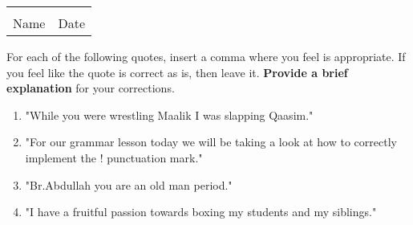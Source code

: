 \documentclass[12pt]{article} %
\begin{document}
  \vspace*{0.4cm}

	\begin{center}
	\noindent\begin{tabular}{ll}
		\makebox[3in]{\hrulefill} & \makebox[3in]{\hrulefill}\\
		Name & Date\\[8ex]%
	\end{tabular}
	\end{center}
	\newpage


\begin{qstn}[1]
  For each of the following quotes, insert a comma where you feel is appropriate. If you feel like the quote
  is correct as is, then leave it. \textbf{Provide a brief explanation} for your corrections.

  \begin{enumerate}
    \item "While you were wrestling Maalik I was slapping Qaasim."
      \vspace*{4cm}

    \item "For our grammar lesson today we will be taking a look at how to
      correctly implement the ! punctuation mark."
      \vspace*{4cm}
      
    \item "Br.Abdullah you are an old man period."
      \vspace*{4cm}

    \item "I have a fruitful passion towards boxing my students and my siblings."
      \vspace*{4cm}

  \end{enumerate}

  
\end{qstn}
\end{document}
